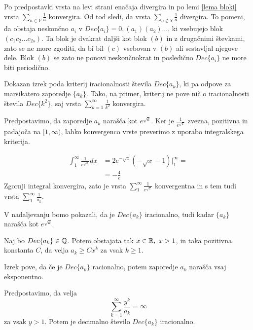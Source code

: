 \documentclass[twoside,11pt]{article}
\begin{document}
Po predpostavki vrsta na levi strani enačaja divergira in po lemi \ref{lema bloki} vrsta $\sum_{a \in Y}\frac{1}{a}$
konvergira. Od tod sledi, da vrsta $\sum_{a \notin Y} \frac{1}{a}$ divergira.
To pomeni, da obstaja neskončno $a_i$ v $Dec\{a_i\} = 0,(a_1)(a_2) \dots$, ki vsebujejo blok 
$(c_1c_2\dots c_{2s})$. Ta blok je dvakrat daljši kot blok $(b)$ in z drugačnimi števkami, zato se ne more
zgoditi, da bi bil $(c)$ vsebovan v $(b)$ ali sestavljal njegove dele. 
Blok $(b)$ se zato ne ponovi neskončnokrat in posledično $Dec\{a_i\}$ ne more biti periodično.

\QED


Dokazan izrek poda kriterij iracionalnosti števila $Dec\{a_k\}$,
ki pa odpove za marsikatero zaporedje $\{a_k\}$.
Tako, na primer, kriterij ne pove nič o iracionalnosti števila $Dec\{k^2\}$, saj vrsta $\sum_{k=1}^{\infty}\frac{1}{k^2}$ konvergira.

Predpostavimo, da zaporedje $a_k$ narašča kot $e^{\sqrt{k}}$.
Ker je $\frac{1}{e^{\sqrt{x}}}$ zvezna, pozitivna in padajoča na $[1, \infty)$,
lahko konvergenco vrste preverimo z uporabo integralskega kriterija.

\[
    \begin{split}
    \int_1^{\infty}\frac{1}{e^{\sqrt{x}}}dx &= 2e^{-\sqrt{x}}(- \sqrt{x} - 1) \big|_1^{\infty} = \\
    &= -\frac{4}{e}
    \end{split}
\]
Zgornji integral konvergira, zato je vrsta $\sum_1^{\infty}\frac{1}{e^{\sqrt{x}}}$ konvergentna
in s tem tudi vrsta $\sum_1^{\infty}\frac{1}{a_k}$.

V nadaljevanju bomo pokazali, da je $Dec\{a_k\}$ iracionalno, tudi kadar $\{a_k\}$ narašča kot $e^{\sqrt{k}}$.

\begin{izrek}
    \label{izrek1clanek2}
    Naj bo $Dec\{a_k\} \in \mathbb{Q}$. Potem obstajata tak $x \in \mathbb{R}, \ x > 1$, in taka pozitivna konstanta $C$,
    da velja $a_k \geq Cx^k$ za vsak $k \geq 1$.
\end{izrek}

Izrek pove, da če je $Dec\{a_k\}$ racionalno, potem zaporedje $a_k$ narašča vsaj eksponentno.

\begin{posledica}
    \label{posledica}
    Predpostavimo, da velja
    \[
        \sum_{k=1}^{\infty}\frac{y^k}{a_k} = \infty\]
    za vsak $y > 1$. Potem je decimalno število $Dec\{a_k\}$ iracionalno.
\end{posledica}
\end{document}
